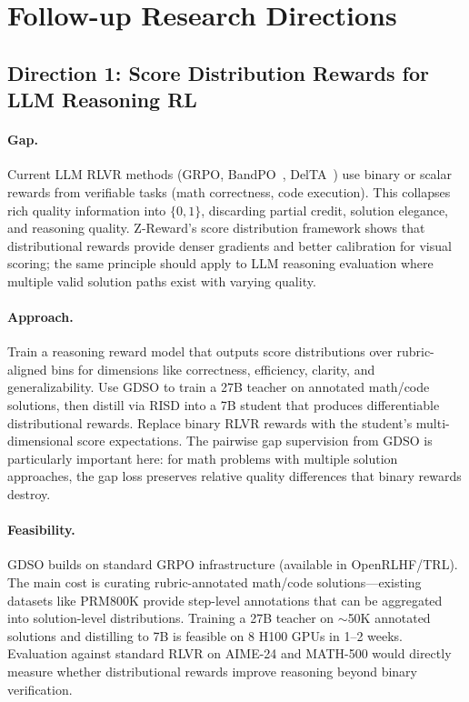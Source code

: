 \documentclass[11pt,a4paper]{article}
\begin{document}
\section{Follow-up Research Directions}

\subsection{Direction 1: Score Distribution Rewards for LLM Reasoning RL}

\paragraph{Gap.} Current LLM RLVR methods (GRPO, BandPO~\cite{li2026bandpo}, DelTA~\cite{wang2026delta}) use binary or scalar rewards from verifiable tasks (math correctness, code execution). This collapses rich quality information into $\{0, 1\}$, discarding partial credit, solution elegance, and reasoning quality. Z-Reward's score distribution framework shows that distributional rewards provide denser gradients and better calibration for visual scoring; the same principle should apply to LLM reasoning evaluation where multiple valid solution paths exist with varying quality.

\paragraph{Approach.} Train a reasoning reward model that outputs score distributions over rubric-aligned bins for dimensions like correctness, efficiency, clarity, and generalizability. Use GDSO to train a 27B teacher on annotated math/code solutions, then distill via RISD into a 7B student that produces differentiable distributional rewards. Replace binary RLVR rewards with the student's multi-dimensional score expectations. The pairwise gap supervision from GDSO is particularly important here: for math problems with multiple solution approaches, the gap loss preserves relative quality differences that binary rewards destroy.

\paragraph{Feasibility.} GDSO builds on standard GRPO infrastructure (available in OpenRLHF/TRL). The main cost is curating rubric-annotated math/code solutions---existing datasets like PRM800K provide step-level annotations that can be aggregated into solution-level distributions. Training a 27B teacher on $\sim$50K annotated solutions and distilling to 7B is feasible on 8 H100 GPUs in 1--2 weeks. Evaluation against standard RLVR on AIME-24 and MATH-500 would directly measure whether distributional rewards improve reasoning beyond binary verification.
\end{document}
